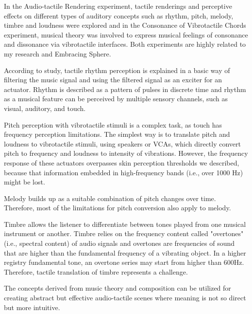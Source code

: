             In the Audio-tactile Rendering experiment\cite{Audio-Tactile_Rendering}, tactile renderings and perceptive effects on different types of auditory concepts such as rhythm, pitch, melody, timbre and loudness were explored and in the Consonance of Vibrotactile Chords experiment\cite{Consonance_of_Vibrotactile_Chords}, musical theory was involved to express musical feelings of consonance and dissonance via vibrotactile interfaces. Both experiments are highly related to my research and Embracing Sphere.

            According to study\cite{Audio-Tactile_Rendering}, tactile rhythm perception is explained in a basic way of filtering the music signal and using the filtered signal as an exciter for an actuator. Rhythm is described as a pattern of pulses in discrete time and rhythm as a musical feature can be perceived by multiple sensory channels, such as visual, auditory, and touch.\par

            Pitch perception with vibrotactile stimuli is a complex task, as touch has frequency perception limitations. The simplest way is to translate pitch and loudness to vibrotactile stimuli, using speakers or VCAs, which directly convert pitch to frequency and loudness to intensity of vibrations. However, the frequency response of these actuators overpasses skin perception thresholds we described, because that information embedded in high-frequency bands (i.e., over 1000 Hz) might be lost.\par

            Melody builds up as a suitable combination of pitch changes over time. Therefore, most of the limitations for pitch conversion also apply to melody.\par

            Timbre allows the listener to differentiate between tones played from one musical instrument or another. Timbre relies on the frequency content called "overtones" (i.e., spectral content) of audio signals and overtones are frequencies of sound that are higher than the fundamental frequency of a vibrating object. In a higher registry fundamental tone, an overtone series may start from higher than 600Hz. Therefore, tactile translation of timbre represents a challenge.\par

            The concepts derived from music theory and composition can be utilized for creating abstract but effective audio-tactile scenes where meaning is not so direct but more intuitive.\par

